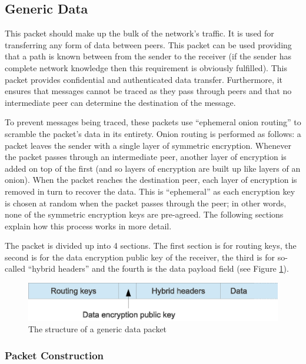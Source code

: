 \documentclass[ %
                    author={Luke Murray},
                supervisor={Dr. Simon Hollis},
                     title={Shadow Peer-to-Peer Networks},
                  subtitle={},
                    degree={MEng},
                      year={2013} ]{thesis}
\begin{document}
\subsection{Generic Data}

This packet should make up the bulk of the network's traffic. It is used for transferring any form of data between peers. This packet can be used providing that a path is known between from the sender to the receiver (if the sender has complete network knowledge then this requirement is obviously fulfilled). This packet provides confidential and authenticated data transfer. Furthermore, it ensures that messages cannot be traced as they pass through peers and that no intermediate peer can determine the destination of the message.

To prevent messages being traced, these packets use ``ephemeral onion routing'' to scramble the packet's data in its entirety. Onion routing is performed as follows: a packet leaves the sender with a single layer of symmetric encryption. Whenever the packet passes through an intermediate peer, another layer of encryption is added on top of the first (and so layers of encryption are built up like layers of an onion). When the packet reaches the destination peer, each layer of encryption is removed in turn to recover the data. This is ``ephemeral'' as each encryption key is chosen at random when the packet passes through the peer; in other words, none of the symmetric encryption keys are pre-agreed. The following sections explain how this process works in more detail.

The packet is divided up into 4 sections. The first section is for routing keys, the second is for the data encryption public key of the receiver, the third is for so-called ``hybrid headers'' and the fourth is the data payload field (see Figure \ref{packet_generic_data}).

\begin{figure}[h]
    \centering
    \includegraphics{diagrams/packet_generic_data.eps}
    \caption{The structure of a generic data packet}
    \label{packet_generic_data}
\end{figure}

\subsubsection{Packet Construction}
\end{document}
